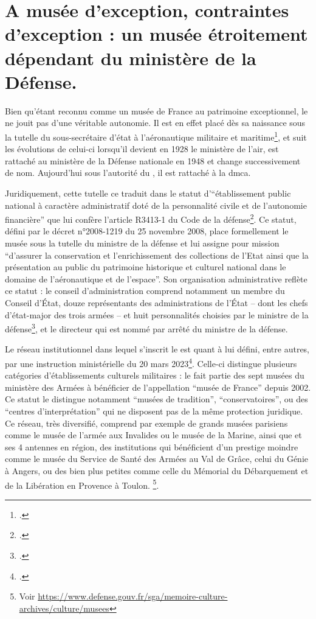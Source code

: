 \section{\label{I-B-1}A musée d'exception, contraintes d'exception : un musée étroitement dépendant du ministère de la Défense. }

Bien qu'étant reconnu comme un musée de France au patrimoine exceptionnel, le \mae ne jouit pas d'une véritable autonomie. Il est en effet placé dès sa naissance sous la tutelle du sous-secrétaire d'état à l'aéronautique militaire et maritime\footcite{terrierAeroportParisBourget2019}, et suit les évolutions de celui-ci lorsqu'il devient en 1928 le ministère de l'air, est rattaché au ministère de la Défense nationale en 1948 et change successivement de nom. Aujourd'hui sous l'autorité du \minarm, il est rattaché à la \gls{dmca}.

Juridiquement, cette tutelle ce traduit dans le statut d'\enquote{établissement public national à caractère administratif doté de la personnalité civile et de l'autonomie financière} que lui confère l'article R3413-1 du Code de la défense\footcite{ArticleR34131Code2008}. Ce statut, défini par le décret n°2008-1219 du 25 novembre 2008, place formellement le musée sous la tutelle du ministre de la défense et lui assigne pour mission  \enquote{d'assurer la conservation et l'enrichissement des collections de l'Etat ainsi que la présentation au public du patrimoine historique et culturel national dans le domaine de l'aéronautique et de l'espace}. Son organisation administrative reflète ce statut : le conseil d'administration comprend notamment un membre du Conseil d'État, douze représentants des administrations de l'État -- dont les chefs d'état-major des trois armées -- et huit personnalités choisies par le ministre de la défense\footcite{ArticleR341373Code2013}, et le directeur qui est nommé par arrêté du ministre de la défense.

Le réseau institutionnel dans lequel s'inscrit le \mae est quant à lui défini, entre autres, par une instruction ministérielle du 20 mars 2023\footcite{ministeredesarmeesInstructionNdeg303ARM2023}. 
Celle-ci distingue plusieurs catégories d'établissements culturels militaires : le \mae fait partie des sept musées du ministère des Armées à bénéficier de l'appellation \enquote{musée de France} depuis 2002. Ce statut le distingue notamment \enquote{musées de tradition}, \enquote{conservatoires}, ou des \enquote{centres d'interprétation} qui ne disposent pas de la même protection juridique. Ce réseau, très diversifié, comprend par exemple de grands musées parisiens comme le musée de l'armée aux Invalides ou le musée de la Marine, ainsi que et ses 4 antennes en région, des institutions qui bénéficient d'un prestige moindre comme le musée du Service de Santé des Armées au Val de Grâce, celui du Génie à Angers, ou des bien plus petites comme celle du Mémorial du Débarquement et de la Libération en Provence à Toulon.
\footnote{Voir \url{https://www.defense.gouv.fr/sga/memoire-culture-archives/culture/musees}}.



